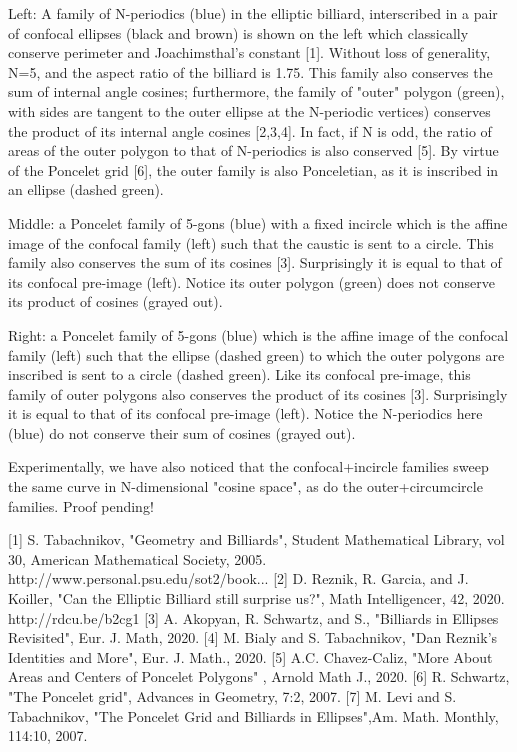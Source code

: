 Left: A family of N-periodics (blue) in the elliptic billiard, interscribed in a pair of confocal ellipses (black and brown) is shown on the left which classically conserve perimeter and Joachimsthal's constant [1]. Without loss of generality, N=5, and the aspect ratio of the billiard is 1.75. This family also conserves the sum of internal angle cosines; furthermore, the family of "outer" polygon (green), with sides are tangent to the outer ellipse at the N-periodic vertices) conserves the product of its internal angle cosines [2,3,4]. In fact, if N is odd, the ratio of areas of the outer polygon to that of N-periodics is also conserved [5]. By virtue of the Poncelet grid [6], the outer family is also Ponceletian, as it is inscribed in an ellipse (dashed green). 

Middle: a Poncelet family of 5-gons (blue) with a fixed incircle which is the affine image of the confocal family (left) such that the caustic is sent to a circle. This family also conserves the sum of its cosines [3]. Surprisingly it is equal to that of its confocal pre-image (left). Notice its outer polygon (green) does not conserve its product of cosines (grayed out).

Right: a Poncelet family of 5-gons (blue) which is the affine image of the confocal family (left) such that the ellipse (dashed green) to which the outer polygons are inscribed is sent to a circle (dashed green). Like its confocal pre-image, this family of outer polygons also conserves the product of its cosines [3]. Surprisingly it is equal to that of its confocal pre-image (left). Notice the N-periodics here (blue) do not conserve their sum of cosines (grayed out).

Experimentally, we have also noticed that the confocal+incircle families sweep the same curve in N-dimensional "cosine space", as do the outer+circumcircle families. Proof pending!

[1] S. Tabachnikov, "Geometry and Billiards", Student Mathematical Library, vol 30, American Mathematical Society, 2005. http://www.personal.psu.edu/sot2/book...​
[2] D. Reznik, R. Garcia, and J. Koiller, "Can the Elliptic Billiard still surprise us?", Math Intelligencer, 42, 2020. http://rdcu.be/b2cg1​
[3] A. Akopyan, R. Schwartz, and S., "Billiards in Ellipses Revisited", Eur. J. Math, 2020. 
[4] M. Bialy and S. Tabachnikov, "Dan Reznik's Identities and More",
Eur. J. Math., 2020.
[5] A.C. Chavez-Caliz, "More About Areas and Centers of Poncelet Polygons" , Arnold Math J., 2020.
[6] R. Schwartz,  "The Poncelet grid", Advances in Geometry, 7:2, 2007.
[7] M. Levi and  S. Tabachnikov, "The Poncelet Grid and Billiards in Ellipses",Am. Math. Monthly,  114:10, 2007.